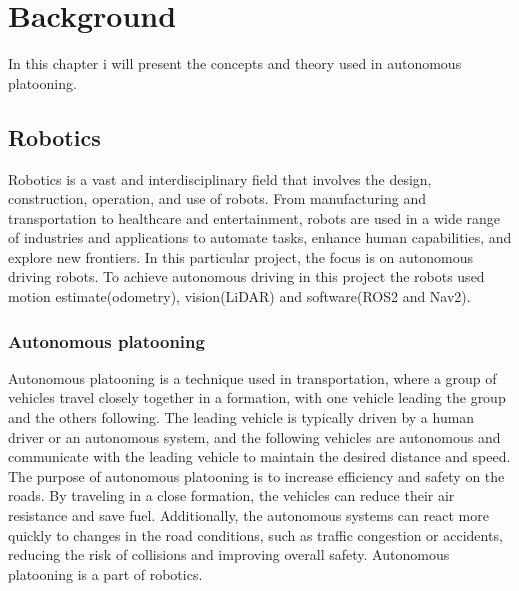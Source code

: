 \chapter{Background}
In this chapter i will present the concepts and theory used in autonomous platooning.  
\section{Robotics}
Robotics is a vast and interdisciplinary field that involves the design, construction, operation, and use of robots. From manufacturing and transportation to healthcare and entertainment, robots are used in a wide range of industries and applications to automate tasks, enhance human capabilities, and explore new frontiers.
In this particular project, the focus is on autonomous driving robots. To achieve autonomous driving in this project the robots used motion estimate(odometry), vision(LiDAR) and software(ROS2 and Nav2). 

\subsection{Autonomous platooning}
Autonomous platooning is a technique used in transportation, where a group of vehicles travel closely together in a formation, with one vehicle leading the group and the others following. The leading vehicle is typically driven by a human driver or an autonomous system, and the following vehicles are autonomous and communicate with the leading vehicle to maintain the desired distance and speed. The purpose of autonomous platooning is to increase efficiency and safety on the roads. By traveling in a close formation, the vehicles can reduce their air resistance and save fuel. Additionally, the autonomous systems can react more quickly to changes in the road conditions, such as traffic congestion or accidents, reducing the risk of collisions and improving overall safety. Autonomous platooning is a part of robotics.

